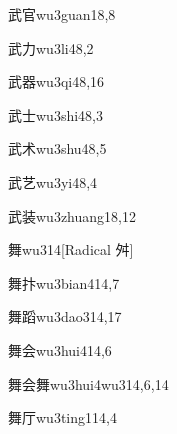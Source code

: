 \begin{verbete}{武官}{wu3guan1}{8,8}
\end{verbete}

\begin{verbete}{武力}{wu3li4}{8,2}
\end{verbete}

\begin{verbete}{武器}{wu3qi4}{8,16}
\end{verbete}

\begin{verbete}{武士}{wu3shi4}{8,3}
\end{verbete}

\begin{verbete}{武术}{wu3shu4}{8,5}
\end{verbete}

\begin{verbete}{武艺}{wu3yi4}{8,4}
\end{verbete}

\begin{verbete}{武装}{wu3zhuang1}{8,12}
\end{verbete}

\begin{verbete}{舞}{wu3}{14}[Radical 舛]
\end{verbete}

\begin{verbete}{舞抃}{wu3bian4}{14,7}
\end{verbete}

\begin{verbete}{舞蹈}{wu3dao3}{14,17}
\end{verbete}

\begin{verbete}{舞会}{wu3hui4}{14,6}
\end{verbete}

\begin{verbete}{舞会舞}{wu3hui4wu3}{14,6,14}
\end{verbete}

\begin{verbete}{舞厅}{wu3ting1}{14,4}
\end{verbete}


